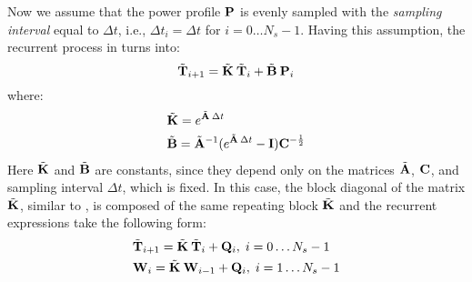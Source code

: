 Now we assume that the power profile $\mathbb{\mathbf{P}}$ is evenly sampled with the \emph{sampling interval} equal to $\Delta t$, i.e., $\Delta t_i = \Delta t$ for $i = 0 \dots N_s - 1$. Having this assumption, the recurrent process in  turns into:
\[
  \tilde{\mathbf{T}}_{i+1} = \tilde{\mathbf{K}} \: \tilde{\mathbf{T}}_i + \tilde{\mathbf{B}} \: \mathbf{P}_i
\]
where:
\begin{align*}
  & \tilde{\mathbf{K}} = e^{\tilde{\mathbf{A}} \: \Delta t} \\
  & \tilde{\mathbf{B}} = \tilde{\mathbf{A}}^{-1} ( e^{\tilde{\mathbf{A}} \: \Delta t} - \mathbf{I} ) \mathbf{C}^{-\frac{1}{2}}
\end{align*}
Here $\tilde{\mathbf{K}}$ and $\tilde{\mathbf{B}}$ are constants, since they depend only on the matrices $\tilde{\mathbf{A}}$, $\mathbf{C}$, and sampling interval $\Delta t$, which is fixed. In this case, the block diagonal of the matrix $\tilde{\mathbb{\mathbf{K}}}$, similar to , is composed of the same repeating block $\tilde{\mathbf{K}}$ and the recurrent expressions take the following form:
\begin{align}
  & \tilde{\mathbf{T}}_{i + 1} = \tilde{\mathbf{K}} \: \tilde{\mathbf{T}}_i + \mathbf{Q}_i, \; i = 0 \dots N_s - 1 \nonumber \\
  & \mathbf{W}_i = \tilde{\mathbf{K}} \: \mathbf{W}_{i - 1} + \mathbf{Q}_i, \; i = 1 \dots N_s - 1 \nonumber
\end{align}
